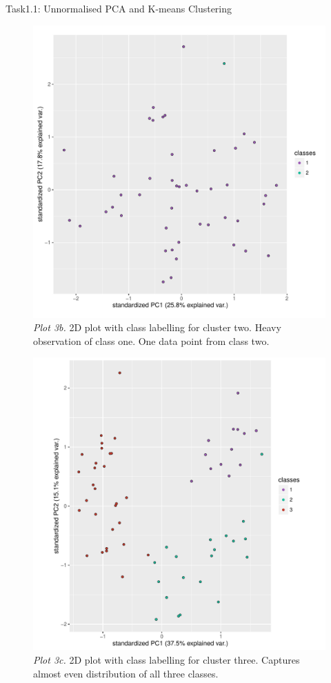 \documentclass[11pt]{article}
\begin{document}
\begin{subsection}{Task1.1: Unnormalised PCA and K-means Clustering}
\begin{figure}[H]
    \centering
    \includegraphics[width=1.0\textwidth]{p3b_un}
    \caption{\textit{Plot 3b.} 2D plot with class labelling for cluster two. Heavy observation of class one. One data point from class two.}
    \label{fig:p3b_un}
\end{figure}

\begin{figure}[H]
    \centering
    \includegraphics[width=1.0\textwidth]{p3c_un}
    \caption{\textit{Plot 3c.} 2D plot with class labelling for cluster three. Captures almost even distribution of all three classes.}
    \label{fig:p3c_un}
\end{figure}
\end{subsection}
\end{document}
